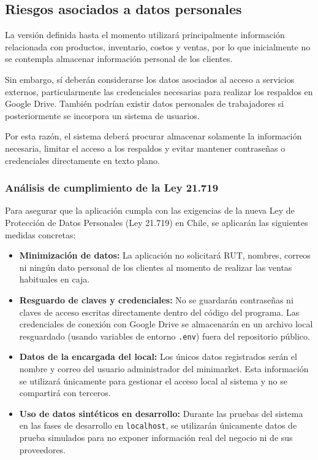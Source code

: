 \documentclass[10pt,a4paper]{article}
\begin{document}
\subsection{Riesgos asociados a datos personales}

La versión definida hasta el momento utilizará principalmente información relacionada con productos, inventario, costos y ventas, por lo que inicialmente no se contempla almacenar información personal de los clientes.

Sin embargo, sí deberán considerarse los datos asociados al acceso a servicios externos, particularmente las credenciales necesarias para realizar los respaldos en Google Drive. También podrían existir datos personales de trabajadores si posteriormente se incorpora un sistema de usuarios.

Por esta razón, el sistema deberá procurar almacenar solamente la información necesaria, limitar el acceso a los respaldos y evitar mantener contraseñas o credenciales directamente en texto plano.

\subsubsection{Análisis de cumplimiento de la Ley 21.719}

Para asegurar que la aplicación cumpla con las exigencias de la nueva Ley de Protección de Datos Personales (Ley 21.719) en Chile, se aplicarán las siguientes medidas concretas:

\begin{itemize}
    \item \textbf{Minimización de datos:} La aplicación no solicitará RUT, nombres, correos ni ningún dato personal de los clientes al momento de realizar las ventas habituales en caja.
    \item \textbf{Resguardo de claves y credenciales:} No se guardarán contraseñas ni claves de acceso escritas directamente dentro del código del programa. Las credenciales de conexión con Google Drive se almacenarán en un archivo local resguardado (usando variables de entorno \texttt{.env}) fuera del repositorio público.
    \item \textbf{Datos de la encargada del local:} Los únicos datos registrados serán el nombre y correo del usuario administrador del minimarket. Esta información se utilizará únicamente para gestionar el acceso local al sistema y no se compartirá con terceros.
    \item \textbf{Uso de datos sintéticos en desarrollo:} Durante las pruebas del sistema en las fases de desarrollo en \texttt{localhost}, se utilizarán únicamente datos de prueba simulados para no exponer información real del negocio ni de sus proveedores.
\end{itemize}
\end{document}
